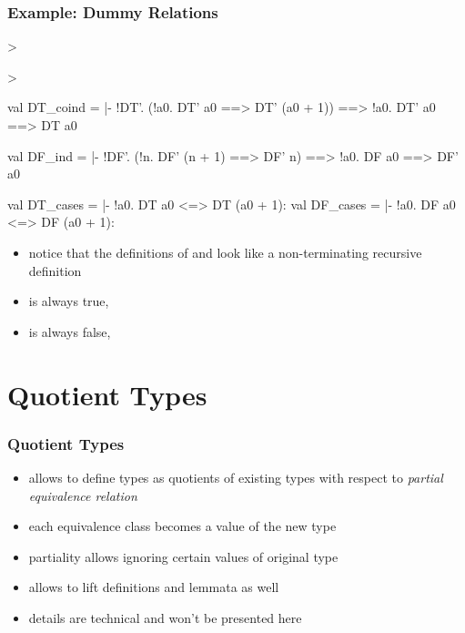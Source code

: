 \begin{frame}[fragile]
\frametitle{Example: Dummy Relations}
\begin{semiverbatim}\scriptsize
> 

> 

val DT_coind =
  |- !DT'. (!a0. DT' a0 ==> DT' (a0 + 1)) ==> !a0. DT' a0 ==> DT a0

val DF_ind =
  |- !DF'. (!n. DF' (n + 1) ==> DF' n) ==> !a0. DF a0 ==> DF' a0

val DT_cases = |- !a0. DT a0 <=> DT (a0 + 1):
val DF_cases = |- !a0. DF a0 <=> DF (a0 + 1):
\end{semiverbatim}
\begin{itemize}
\item notice that the definitions of  and  look like a non-terminating recursive definition
\item {} is always true, \ie {}
\item {} is always false, \ie {}
\end{itemize}
\end{frame}



\section{Quotient Types}

\begin{frame}
\frametitle{Quotient Types}

\begin{itemize}
\item {} allows to define types as quotients of existing types with respect to \emph{partial equivalence relation}
\item each equivalence class becomes a value of the new type
\item partiality allows ignoring certain values of original type
\item {} allows to lift definitions and lemmata as well
\item details are technical and won't be presented here
\end{itemize}

\end{frame}



